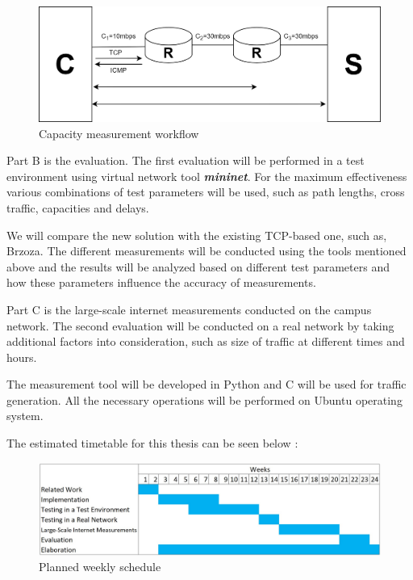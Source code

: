 \documentclass[NET,a4paper,12pt,ngerman]{netforms}
\begin{document}
\begin{figure}[h]
    \centering
    \includegraphics[scale=0.25]{images/NetworkDiag.png}
    \caption{Capacity measurement workflow  }
    \label{fig:mesh1}
\end{figure}


Part B is the evaluation. 
The first evaluation will be performed in a test environment using virtual network tool \textbf{\textit{mininet}}\cite{mininet}. For the maximum effectiveness various combinations of test parameters will be used, such as path lengths, cross traffic, capacities and delays.


We will compare the new solution with the existing TCP-based one, such as, Brzoza\cite{BrzozaThesis}. The different measurements will be conducted using the tools mentioned above and the results will be analyzed based on different test parameters and how these parameters influence the accuracy of measurements. 

Part C is the large-scale internet measurements conducted on the campus network. 
The second evaluation will be conducted on a real network by taking additional factors into consideration, such as size of traffic at different times and hours. 

The measurement tool will be developed in Python and C will be used for traffic generation. All the necessary operations will be performed on Ubuntu operating system.

The estimated timetable for this thesis can be seen below $\colon$

\begin{figure}[h]
    \centering
    \includegraphics[scale=0.3]{images/GanttChart.jpg}
    \caption{Planned weekly schedule}
    \label{fig:mesh1}
\end{figure}
\end{document}
